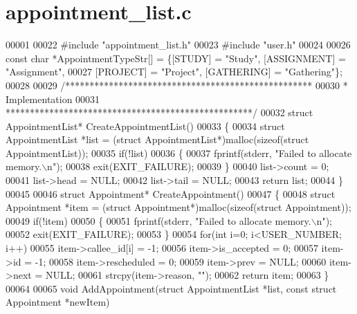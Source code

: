 \section{appointment\+\_\+list.\+c}
\label{appointment__list_8c_source}

\begin{DoxyCode}
00001 
00022 \textcolor{preprocessor}{#include "appointment_list.h"}
00023 \textcolor{preprocessor}{#include "user.h"}
00024 
00026 \textcolor{keyword}{const} \textcolor{keywordtype}{char} *AppointmentTypeStr[] = \{[STUDY] = \textcolor{stringliteral}{"Study"}, [ASSIGNMENT] = \textcolor{stringliteral}{"Assignment"},
00027     [PROJECT] = \textcolor{stringliteral}{"Project"}, [GATHERING] = \textcolor{stringliteral}{"Gathering"}\};
00028 
00029 \textcolor{comment}{/***************************************************}
00030 \textcolor{comment}{ * Implementation}
00031 \textcolor{comment}{ ***************************************************/}
00032 \textcolor{keyword}{struct }AppointmentList* CreateAppointmentList()
00033 \{
00034     \textcolor{keyword}{struct }AppointmentList *list = (\textcolor{keyword}{struct }AppointmentList*)malloc(\textcolor{keyword}{sizeof}(\textcolor{keyword}{struct} 
      AppointmentList));
00035     \textcolor{keywordflow}{if}(!list)
00036     \{
00037         fprintf(stderr, \textcolor{stringliteral}{"Failed to allocate memory.\(\backslash\)n"});
00038         exit(EXIT\_FAILURE);
00039     \}
00040     list->count = 0;
00041     list->head = NULL;
00042     list->tail = NULL;
00043     \textcolor{keywordflow}{return} list;
00044 \}
00045 
00046 \textcolor{keyword}{struct }Appointment* CreateAppointment()
00047 \{
00048     \textcolor{keyword}{struct }Appointment *item = (\textcolor{keyword}{struct }Appointment*)malloc(\textcolor{keyword}{sizeof}(\textcolor{keyword}{struct} 
      Appointment));
00049     \textcolor{keywordflow}{if}(!item)
00050     \{
00051         fprintf(stderr, \textcolor{stringliteral}{"Failed to allocate memory.\(\backslash\)n"});
00052         exit(EXIT\_FAILURE);
00053     \}
00054     \textcolor{keywordflow}{for}(\textcolor{keywordtype}{int} i=0; i<USER_NUMBER; i++)
00055         item->callee\_id[i] = -1;
00056     item->is\_accepted = 0;
00057     item->id = -1;
00058     item->rescheduled = 0;
00059     item->prev = NULL;
00060     item->next = NULL;
00061     strcpy(item->reason, \textcolor{stringliteral}{""});
00062     \textcolor{keywordflow}{return} item;
00063 \}
00064 
00065 \textcolor{keywordtype}{void} AddAppointment(\textcolor{keyword}{struct} AppointmentList *list, \textcolor{keyword}{const} \textcolor{keyword}{struct} Appointment *newItem)

\end{DoxyCode}
